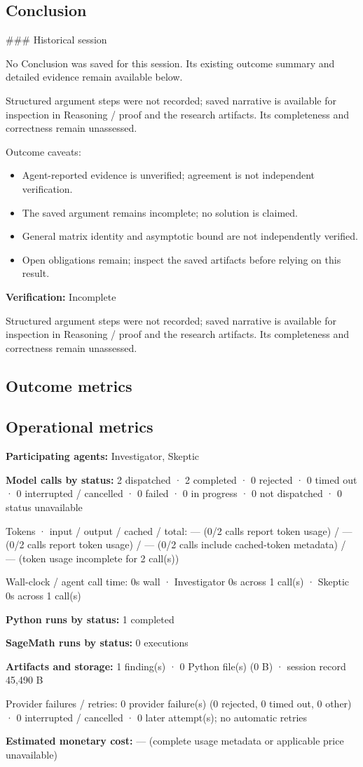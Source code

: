 \documentclass[11pt]{article}
\begin{document}
\subsection{Conclusion}
\#\#\# Historical session

No Conclusion was saved for this session. Its existing outcome summary and detailed evidence remain available below.

Structured argument steps were not recorded; saved narrative is available for inspection in Reasoning / proof and the research artifacts. Its completeness and correctness remain unassessed.\par
Outcome caveats:\par
\begin{itemize}
\item Agent-reported evidence is unverified; agreement is not independent verification.
\item The saved argument remains incomplete; no solution is claimed.
\item General matrix identity and asymptotic bound are not independently verified.
\item Open obligations remain; inspect the saved artifacts before relying on this result.
\end{itemize}
\textbf{Verification:} Incomplete\par
Structured argument steps were not recorded; saved narrative is available for inspection in Reasoning / proof and the research artifacts. Its completeness and correctness remain unassessed.\par
\subsection{Outcome metrics}
\subsection{Operational metrics}
\textbf{Participating agents:} Investigator, Skeptic\par
\textbf{Model calls by status:} 2 dispatched · 2 completed · 0 rejected · 0 timed out · 0 interrupted / cancelled · 0 failed · 0 in progress · 0 not dispatched · 0 status unavailable\par
Tokens · input / output / cached / total: — (0/2 calls report token usage) / — (0/2 calls report token usage) / — (0/2 calls include cached-token metadata) / — (token usage incomplete for 2 call(s))\par
Wall-clock / agent call time: 0s wall · Investigator 0s across 1 call(s) · Skeptic 0s across 1 call(s)\par
\textbf{Python runs by status:} 1 completed\par
\textbf{SageMath runs by status:} 0 executions\par
\textbf{Artifacts and storage:} 1 finding(s) · 0 Python file(s) (0 B) · session record 45,490 B\par
Provider failures / retries: 0 provider failure(s) (0 rejected, 0 timed out, 0 other) · 0 interrupted / cancelled · 0 later attempt(s); no automatic retries\par
\textbf{Estimated monetary cost:} — (complete usage metadata or applicable price unavailable)\par
\end{document}
